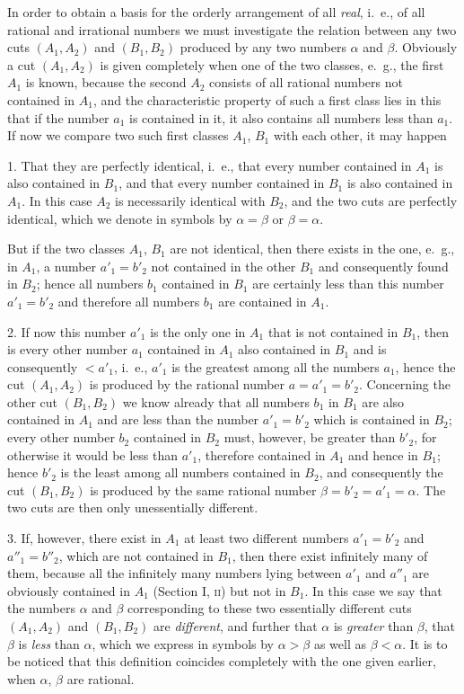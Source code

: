 \documentclass[oneside]{book}
\begin{document}
In order to obtain a basis for the orderly arrangement
of all \textit{real}, i.~e., of all rational and irrational
numbers we must investigate the relation between
any two cuts $(A_1, A_2)$ and $(B_1, B_2)$ produced by any
two numbers $\alpha$ and $\beta$. Obviously a cut $(A_1, A_2)$ is
given completely when one of the two classes, e.~g.,
the first $A_1$ is known, because the second $A_2$ consists
of all rational numbers not contained in $A_1$, and the
characteristic property of such a first class lies in this
that if the number $a_1$ is contained in it, it also contains
all numbers less than $a_1$. If now we compare
two such first classes $A_1$, $B_1$ with each other, it may
happen

1. That they are perfectly identical, i.~e., that every
number contained in $A_1$ is also contained in $B_1$, and
that every number contained in $B_1$ is also contained
in $A_1$. In this case $A_2$ is necessarily identical with
$B_2$, and the two cuts are perfectly identical, which we
denote in symbols by $\alpha=\beta$ or $\beta=\alpha$.

But if the two classes $A_1$, $B_1$ are not identical,
then there exists in the one, e.~g., in $A_1$, a number
$a'_1=b'_2$ not contained in the other $B_1$ and consequently
found in $B_2$; hence all numbers $b_1$ contained
in $B_1$ are certainly less than this number $a'_1=b'_2$ and
therefore all numbers $b_1$ are contained in $A_1$.

2. If now this number $a'_1$ is the only one in $A_1$ that
is not contained in $B_1$, then is every other number $a_1$
contained in $A_1$ also contained in $B_1$ and is consequently
$<a'_1$, i.~e., $a'_1$ is the greatest among all the
numbers $a_1$, hence the cut $(A_1, A_2)$ is produced by
the rational number $a=a'_1=b'_2$. Concerning the
other cut $(B_1, B_2)$ we know already that all numbers
$b_1$ in $B_1$ are also contained in $A_1$ and are less than
the number $a'_1=b'_2$ which is contained in $B_2$; every
other number $b_2$ contained in $B_2$ must, however, be
greater than $b'_2$, for otherwise it would be less than
$a'_1$, therefore contained in $A_1$ and hence in $B_1$; hence
$b'_2$ is the least among all numbers contained in $B_2$,
and consequently the cut $(B_1, B_2)$ is produced by the
same rational number $\beta = b'_2 = a'_1 = \alpha$. The two cuts
are then only unessentially different.

3. If, however, there exist in $A_1$ at least two different
numbers $a'_1 = b'_2$ and $a''_1 = b''_2$, which are not contained
in $B_1$, then there exist infinitely many of them,
because all the infinitely many numbers lying between
$a'_1$ and $a''_1$ are obviously contained in $A_1$ (Section I,
\textsc{ii}) but not in $B_1$. In this case we say that the numbers
$\alpha$ and $\beta$ corresponding to these two essentially
different cuts $(A_1, A_2)$ and $(B_1, B_2)$ are \textit{different}, and
further that $\alpha$ is \textit{greater} than $\beta$, that $\beta$ is \textit{less} than $\alpha$,
which we express in symbols by $\alpha > \beta$ as well as $\beta < \alpha$.
It is to be noticed that this definition coincides completely
with the one given earlier, when $\alpha$, $\beta$ are rational.
\end{document}
